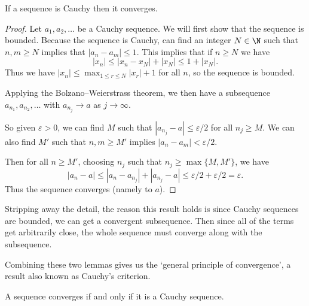 \documentclass[a4paper]{scrartcl}
\begin{document}
\begin{lemma}[Completeness]
	If a sequence is Cauchy then it converges.
\end{lemma}
\begin{proof}
	Let $a_1, a_2, \dots$ be a Cauchy sequence. We will first show that the sequence is bounded. 
	Because the sequence is Cauchy, can find an integer $N \in \N$ such that $n, m \geq N$ implies that $|a_n - a_m| \leq 1$.
	This implies that if $n \geq N$ we have
	$$
		|x_n| \leq |x_n - x_{N}| + |x_{N}| \leq 1 + |x_{N}|.
	$$
	Thus we have $\displaystyle |x_n| \leq \max_{1 \leq r \leq N} |x_r| + 1$ for all $n$, so the sequence is bounded.

	Applying the Bolzano–Weierstrass theorem, we then have a subsequence $a_{n_1}, a_{n_2}, \dots$ with $a_{n_j} \rightarrow a$ as $j \rightarrow \infty$. 
	
	So given $\varepsilon > 0$, we can find $M$ such that $|a_{n_j} - a| \leq \varepsilon/2$ for all $n_j \geq M$. We can also find $M'$ such that $n, m \geq M'$ implies $|a_n - a_{m}| < \varepsilon/2$. 
	
	Then for all $n \geq M'$, choosing $n_j$ such that $n_j \geq \max\{M, M'\}$, we have
	$$
		|a_n - a| \leq |a_n - a_{n_j}| + |a_{n_j} - a| \leq \varepsilon/2 + \varepsilon/2 = \varepsilon.
	$$
	Thus the sequence converges (namely to $a$).
\end{proof}

Stripping away the detail, the reason this result holds is since Cauchy sequences are bounded, we can get a convergent subsequence. Then since all of the terms get arbitrarily close, the whole sequence must converge along with the subsequence.

Combining these two lemmas gives us the `general principle of convergence', a result also known as Cauchy's criterion.

\begin{theorem}
	A sequence converges if and only if it is a Cauchy sequence.
\end{theorem}
\end{document}
